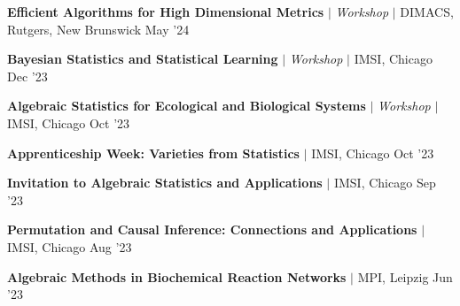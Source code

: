 \resumeProjectHeading
{\textbf{Efficient Algorithms for High Dimensional Metrics} $|$ \textit{Workshop} $|$ DIMACS, Rutgers, New Brunswick}
{May '24}
{}
\vspace{\mygap}

\resumeProjectHeading
{\textbf{Bayesian Statistics and Statistical Learning} $|$ \textit{Workshop} $|$ IMSI, Chicago}
{Dec '23}
{}
\vspace{\mygap}

\resumeProjectHeading
{\textbf{Algebraic Statistics for Ecological and Biological Systems} $|$ \textit{Workshop}  $|$ IMSI, Chicago}
{Oct '23}
{}
\vspace{\mygap}

\resumeProjectHeading
{\textbf{Apprenticeship Week: Varieties from Statistics} $|$ IMSI, Chicago}
{{Oct '23}}
{}
\vspace{\mygap}

\resumeProjectHeading
{\textbf{Invitation to Algebraic Statistics and Applications}   $|$ IMSI, Chicago}
{{Sep '23}}
{}
\vspace{\mygap}

\resumeProjectHeading
{\textbf{Permutation and Causal Inference: Connections and Applications} $|$ IMSI, Chicago}
{{Aug '23}}
{}
\vspace{\mygap}

\resumeProjectHeading
{\textbf{Algebraic Methods in Biochemical Reaction Networks}  $|$ MPI, Leipzig}
{{Jun '23}}
{}


%



